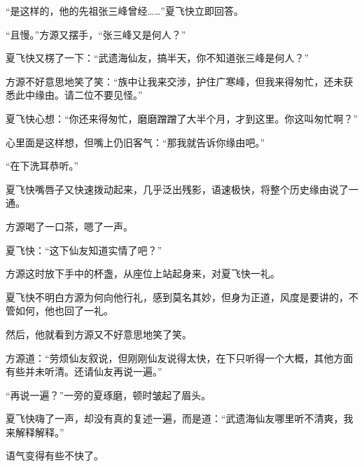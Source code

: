\begin{this_body}
“是这样的，他的先祖张三峰曾经……”夏飞快立即回答。

“且慢。”方源又摆手，“张三峰又是何人？”

夏飞快又楞了一下：“武遗海仙友，搞半天，你不知道张三峰是何人？”

方源不好意思地笑了笑：“族中让我来交涉，护住广寒峰，但我来得匆忙，还未获悉此中缘由。请二位不要见怪。”

夏飞快心想：“你还来得匆忙，磨磨蹭蹭了大半个月，才到这里。你这叫匆忙啊？”

心里面是这样想，但嘴上仍旧客气：“那我就告诉你缘由吧。”

“在下洗耳恭听。”

夏飞快嘴唇子又快速拨动起来，几乎泛出残影，语速极快，将整个历史缘由说了一通。

方源喝了一口茶，嗯了一声。

夏飞快：“这下仙友知道实情了吧？”

方源这时放下手中的杯盏，从座位上站起身来，对夏飞快一礼。

夏飞快不明白方源为何向他行礼，感到莫名其妙，但身为正道，风度是要讲的，不管如何，他也回了一礼。

然后，他就看到方源又不好意思地笑了笑。

方源道：“劳烦仙友叙说，但刚刚仙友说得太快，在下只听得一个大概，其他方面有些并未听清。还请仙友再说一遍。”

“再说一遍？”一旁的夏琢磨，顿时皱起了眉头。

夏飞快嗨了一声，却没有真的复述一遍，而是道：“武遗海仙友哪里听不清爽，我来解释解释。”

语气变得有些不快了。

\end{this_body}

